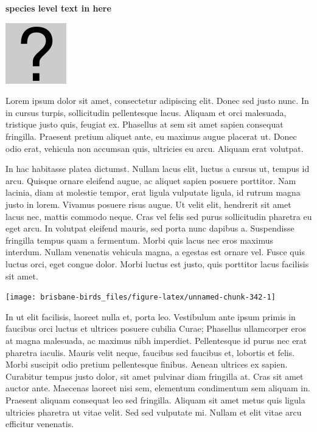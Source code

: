 \documentclass[]{book}
\let\origfigure\figure
\let\endorigfigure\endfigure
\renewenvironment{figure}[1][2] {
  \expandafter\origfigure\expandafter[H]
} {
  \endorigfigure
}
\begin{document}
\textbf{species level text in here}

\begin{figure}
\centering
\includegraphics{assets/missing.png}
\caption{No image for species}
\end{figure}

Lorem ipsum dolor sit amet, consectetur adipiscing elit. Donec sed justo
nunc. In in cursus turpis, sollicitudin pellentesque lacus. Aliquam et
orci malesuada, tristique justo quis, feugiat ex. Phasellus at sem sit
amet sapien consequat fringilla. Praesent pretium aliquet ante, eu
maximus augue placerat ut. Donec odio erat, vehicula non accumsan quis,
ultricies eu arcu. Aliquam erat volutpat.

In hac habitasse platea dictumst. Nullam lacus elit, luctus a cursus ut,
tempus id arcu. Quisque ornare eleifend augue, ac aliquet sapien posuere
porttitor. Nam lacinia, diam at molestie tempor, erat ligula vulputate
ligula, id rutrum magna justo in lorem. Vivamus posuere risus augue. Ut
velit elit, hendrerit sit amet lacus nec, mattis commodo neque. Cras vel
felis sed purus sollicitudin pharetra eu eget arcu. In volutpat eleifend
mauris, sed porta nunc dapibus a. Suspendisse fringilla tempus quam a
fermentum. Morbi quis lacus nec eros maximus interdum. Nullam venenatis
vehicula magna, a egestas est ornare vel. Fusce quis luctus orci, eget
congue dolor. Morbi luctus est justo, quis porttitor lacus facilisis sit
amet.

\begin{figure}
\texttt{[image: brisbane-birds\_files/figure-latex/unnamed-chunk-342-1]} \caption{insert figure caption}\label{fig:unnamed-chunk-342}
\end{figure}

In ut elit facilisis, laoreet nulla et, porta leo. Vestibulum ante ipsum
primis in faucibus orci luctus et ultrices posuere cubilia Curae;
Phasellus ullamcorper eros at magna malesuada, ac maximus nibh
imperdiet. Pellentesque id purus nec erat pharetra iaculis. Mauris velit
neque, faucibus sed faucibus et, lobortis et felis. Morbi suscipit odio
pretium pellentesque finibus. Aenean ultrices ex sapien. Curabitur
tempus justo dolor, sit amet pulvinar diam fringilla at. Cras sit amet
auctor ante. Maecenas laoreet nisi sem, elementum condimentum sem
aliquam in. Praesent aliquam consequat leo sed fringilla. Aliquam sit
amet metus quis ligula ultricies pharetra ut vitae velit. Sed sed
vulputate mi. Nullam et elit vitae arcu efficitur venenatis.
\end{document}
